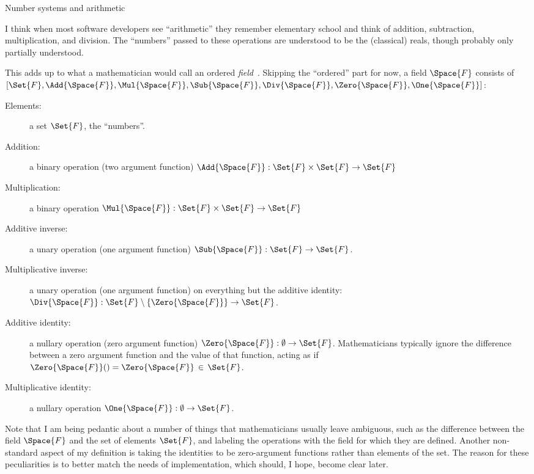 \documentclass[12pt]{PalisadesLakesBook}
\begin{document}
\BeginAppendices
\begin{plSection}{Number systems and arithmetic}
\label{sec:NumberSystems}

I think when most software developers see ``arithmetic''
they remember elementary school
and think of addition, subtraction, multiplication, and division.
The ``numbers'' passed to these operations are 
understood to be the (classical) reals, 
though probably only partially understood.

This adds up to what a mathematician would call an ordered 
\emph{field}~\cite{wiki:FieldMathematics}.
Skipping the ``ordered'' part for now,
a field $\Space{F}$ consists of
$[\Set{F},\Add{\Space{F}},\Mul{\Space{F}},
\Sub{\Space{F}},\Div{\Space{F}},\Zero{\Space{F}}, \One{\Space{F}}]$:
\begin{description}
\item[Elements:] a set $\Set{F}$, the ``numbers''.
\item[Addition:] a binary operation (two argument function)
$\Add{\Space{F}} : \Set{F} \times \Set{F} \rightarrow \Set{F}$
\item[Multiplication:] a binary operation 
$\Mul{\Space{F}} : \Set{F} \times \Set{F} \rightarrow \Set{F}$
\item[Additive inverse:] a unary operation (one argument function)
$\Sub{\Space{F}} :\Set{F} \rightarrow \Set{F}$.
\item[Multiplicative inverse:] 
a unary operation (one argument function)
on everything but the additive identity:
$\Div{\Space{F}} :  \Set{F} \setminus \left\{\Zero{\Space{F}}\right\} 
\rightarrow \Set{F}$.
\item[Additive identity:] a nullary operation 
(zero argument function)
$\Zero{\Space{F}} : \emptyset \rightarrow \Set{F}$.
Mathematicians typically ignore the difference between a zero
argument function and the value of that function,
acting as if $\Zero{\Space{F}}() = \Zero{\Space{F}}\, \in \, \Set{F}$.
\item[Multiplicative identity:] a nullary operation 
$\One{\Space{F}} : \emptyset \rightarrow \Set{F}$.
\end{description}
Note that I am being pedantic about a number of things
that mathematicians usually leave ambiguous,
such as the difference between the field $\Space{F}$ 
and the set of elements $\Set{F}$,
and labeling the operations
with the field for which they are defined.
Another non-standard aspect of my definition is taking
the identities to be zero-argument functions rather than
elements of the set.
The reason for these peculiarities is to better match the needs 
of implementation, which should, I hope, 
become clear later.


\end{plSection}
\end{document}
